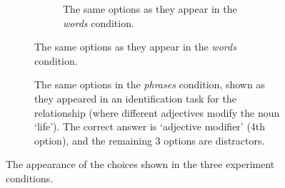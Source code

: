 \begin{figure}[th]
\begin{subfigure}{0.5\columnwidth}
	    \begin{subfigure}{\columnwidth}
	    	\centering
	        \caption {The same options as they appear in the \emph{words} condition. \label{fig:words-choices}}
	    \end{subfigure}
\end{subfigure}
\quad
\begin{subfigure} {1.5\columnwidth}
			\centering
	\caption{\label{fig:task} The same options in the \emph{phrases} condition, shown as they appeared in an identification task for the relationship  (where different adjectives modify the noun `life'). The correct answer is `adjective modifier' (4th option), and the remaining 3 options are distractors.}
	\end{subfigure}

\caption{\label{fig:choices} The appearance of the choices shown in the three experiment conditions.}
\end{figure}


